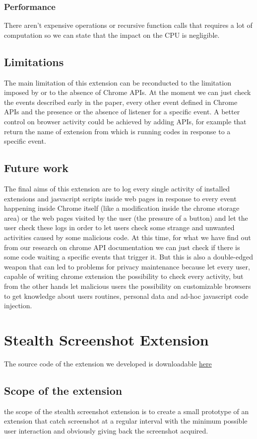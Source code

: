 \documentclass[12pt]{article}
\begin{document}
\begin{multicols}{2}
\subsubsection*{Performance}
There aren't expensive operations or recursive function calls that requires a lot of computation so we can state that the impact on the CPU is negligible.
\subsection*{Limitations}
The main limitation of this extension can be reconducted to the limitation imposed by or to the absence of Chrome APIs.
At the moment we can just check the events described early in the paper, every other event defined in Chrome APIs and the presence or the absence of listener for a specific event.
A better control on browser activity could be achieved by adding APIs, for example that return the name of extension from which is running codes in response to a specific event.
\subsection*{Future work}
The final aims of this extension are to log every single activity of installed extensions and jasvacript scripts inside web pages in response to every event happening inside Chrome itself (like a modification inside the chrome storage area) or the web pages visited by the user (the pressure of a button) and let the user check these logs	in order to let users check some strange and unwanted activities caused by some malicious code. At this time, for what we have find out from our research on chrome API documentation we can just check if there is some code waiting a specific events that trigger it.
But this is also a double-edged weapon that can led to problems for privacy maintenance because let every user, capable of writing chrome extension the possibility to check every activity, but from the other hands let malicious users the possibility  on customizable browsers to get knowledge about users routines, personal data and ad-hoc javascript code injection.
\section*{Stealth Screenshot Extension}
The source code of the extension we developed is downloadable \href{https://github.com/Trexy94/Stealth-screenshot}{here}
\subsection*{Scope of the extension}
the scope of the stealth screenshot extension is to create a small prototype of an extension that catch screenshot at a regular interval with the minimum possible user interaction and obviously giving back the screenshot acquired.

\end{multicols}
\end{document}
